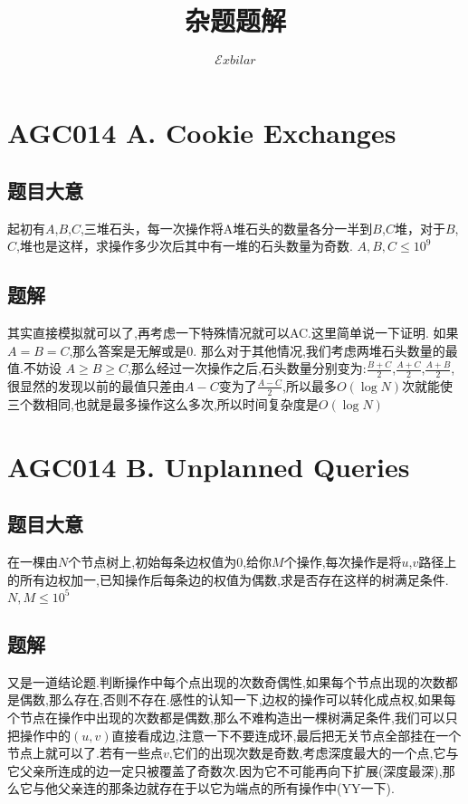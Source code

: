 \documentclass[landscape]{article}
\date{}
\title{杂题题解}
\author{$\mathcal Exbilar$}
\begin{document}
\maketitle

\section{AGC014 A. Cookie Exchanges}

\subsection{题目大意}

起初有$A$,$B$,$C$,三堆石头，每一次操作将A堆石头的数量各分一半到$B$,$C$堆，对于$B$,$C$,堆也是这样，求操作多少次后其中有一堆的石头数量为奇数. $A,B,C \le { 10 }^{ 9 }$

\subsection{题解}

其实直接模拟就可以了,再考虑一下特殊情况就可以AC.这里简单说一下证明.
如果$A=B=C$,那么答案是无解或是0.
那么对于其他情况,我们考虑两堆石头数量的最值.不妨设 $A \ge B \ge C$,那么经过一次操作之后,石头数量分别变为:$\frac { B + C }{2}$,$\frac { A + C }{2}$,$\frac { A + B }{2}$,很显然的发现以前的最值只差由$A-C$变为了$\frac {A - C}{2}$,所以最多$O(\log{N})$次就能使三个数相同,也就是最多操作这么多次,所以时间复杂度是$O({\log {N}})$ 

\newpage

\section{AGC014 B. Unplanned Queries}

\subsection{题目大意}

在一棵由$N$个节点树上,初始每条边权值为$0$,给你$M$个操作,每次操作是将$u$,$v$路径上的所有边权加一,已知操作后每条边的权值为偶数,求是否存在这样的树满足条件. $N,M \le {10}^{5}$

\subsection{题解}

又是一道结论题.判断操作中每个点出现的次数奇偶性,如果每个节点出现的次数都是偶数,那么存在,否则不存在.感性的认知一下,边权的操作可以转化成点权,如果每个节点在操作中出现的次数都是偶数,那么不难构造出一棵树满足条件,我们可以只把操作中的$(u,v)$直接看成边,注意一下不要连成环,最后把无关节点全部挂在一个节点上就可以了.若有一些点$v$,它们的出现次数是奇数,考虑深度最大的一个点,它与它父亲所连成的边一定只被覆盖了奇数次.因为它不可能再向下扩展(深度最深),那么它与他父亲连的那条边就存在于以它为端点的所有操作中(YY一下).
\end{document}
